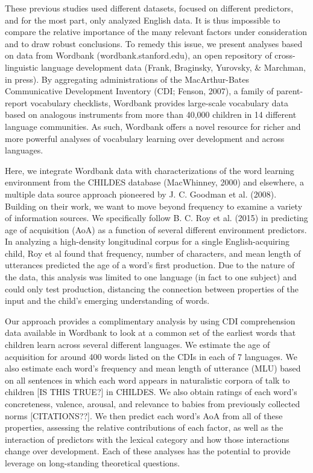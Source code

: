 \documentclass[10pt, letterpaper]{article}
\begin{document}
These previous studies used different datasets, focused on different
predictors, and for the most part, only analyzed English data. It is
thus impossible to compare the relative importance of the many relevant
factors under consideration and to draw robust conclusions. To remedy
this issue, we present analyses based on data from Wordbank
(wordbank.stanford.edu), an open repository of cross-linguistic language
development data (Frank, Braginsky, Yurovsky, \& Marchman, in press). By
aggregating administrations of the MacArthur-Bates Communicative
Development Inventory (CDI; Fenson, 2007), a family of parent-report
vocabulary checklists, Wordbank provides large-scale vocabulary data
based on analogous instruments from more than 40,000 children in 14
different language communities. As such, Wordbank offers a novel
resource for richer and more powerful analyses of vocabulary learning
over development and across languages.

Here, we integrate Wordbank data with characterizations of the word
learning environment from the CHILDES database (MacWhinney, 2000) and
elsewhere, a multiple data source approach pioneered by J. C. Goodman et
al. (2008). Building on their work, we want to move beyond frequency to
examine a variety of information sources. We specifically follow B. C.
Roy et al. (2015) in predicting age of acquisition (AoA) as a function
of several different environment predictors. In analyzing a high-density
longitudinal corpus for a single English-acquiring child, Roy et al
found that frequency, number of characters, and mean length of
utterances predicted the age of a word's first production. Due to the
nature of the data, this analysis was limited to one language (in fact
to one subject) and could only test production, distancing the
connection between properties of the input and the child's emerging
understanding of words.

Our approach provides a complimentary analysis by using CDI
comprehension data available in Wordbank to look at a common set of the
earliest words that children learn across several different languages.
We estimate the age of acquisition for around 400 words listed on the
CDIs in each of 7 languages. We also estimate each word's frequency and
mean length of utterance (MLU) based on all sentences in which each word
appears in naturalistic corpora of talk to children {[}IS THIS TRUE?{]}
in CHILDES. We also obtain ratings of each word's concreteness, valence,
arousal, and relevance to babies from previously collected norms
{[}CITATIONS??{]}. We then predict each word's AoA from all of these
properties, assessing the relative contributions of each factor, as well
as the interaction of predictors with the lexical category and how those
interactions change over development. Each of these analyses has the
potential to provide leverage on long-standing theoretical questions.
\end{document}
